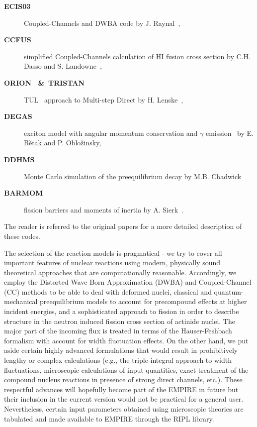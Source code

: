 \begin{description}
\item[\textbf{ECIS03%
}] Coupled-Channels and DWBA code by J. Raynal~\cite{ECIS},

\item[\textbf{CCFUS%
}] simplified Coupled-Channels calculation of HI fusion cross section by C.H. Dasso and S. Landowne~\cite{CCFUS},

\item[\textbf{ORION%
~\&~TRISTAN%
}] TUL~\cite{TUL} approach to Multi-step Direct by H. Lenske~\cite{ORTRI},

\item[\textbf{DEGAS%
}] exciton model with angular momentum conservation and $\gamma $ emission~\cite{Degas} by E. B\v{e}tak and P. Oblo\v{z}insky,

\item[\textbf{DDHMS%
}] Monte Carlo simulation of the preequilibrium decay by M.B. Chadwick~\cite{DDHMScode}

\item[\textbf{BARMOM%
}] fission barriers and moments of inertia by A. Sierk~\cite{sierk}.
\end{description}

The reader is referred to the original papers for a more detailed
description of these codes.

The selection of the reaction models is pragmatical - we try to cover all
important features of nuclear reactions using modern, physically sound
theoretical approaches that are computationally reasonable. Accordingly, we
employ the Distorted Wave Born Approximation (DWBA) and Coupled-Channel (CC)
methods to be able to deal with deformed nuclei, classical and
quantum-mechanical preequilibrium models to account for precompound effects
at higher incident energies, and a sophisticated approach to fission in
order to describe structure in the neutron induced fission cross section of
actinide nuclei. The major part of the incoming flux is treated in terms of
the Hauser-Feshbach formalism with account for width fluctuation effects. On
the other hand, we put aside certain highly advanced formulations that would
result in prohibitively lengthy or complex calculations (e.g., the
triple-integral approach to width fluctuations, microscopic calculations of
input quantities, exact treatment of the compound nucleus reactions in
presence of strong direct channels, etc.). These respectful advances will
hopefully become part of the EMPIRE in future but their inclusion in the
current version would not be practical for a general user. Nevertheless,
certain input parameters obtained using microscopic theories are tabulated
and made available to EMPIRE through the RIPL library.

